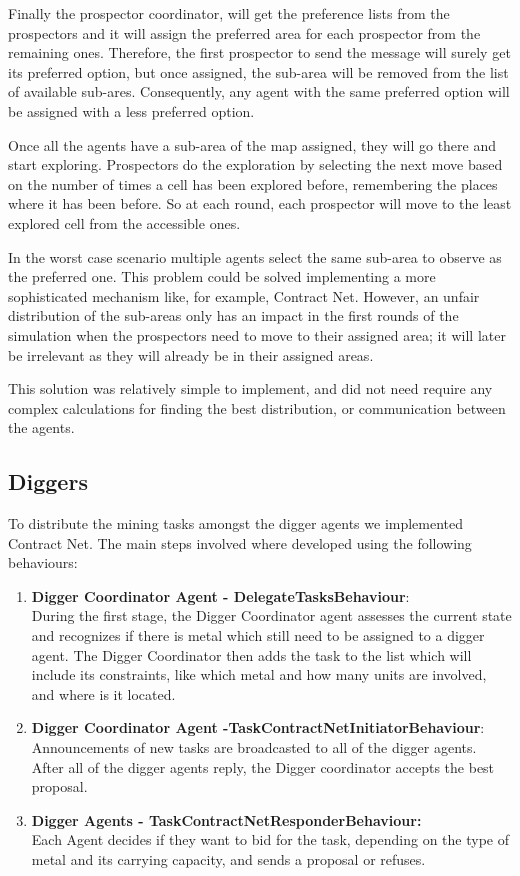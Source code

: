 Finally the prospector coordinator, will get the preference lists from the prospectors and it will assign the preferred area for each prospector from the remaining ones. Therefore, the first prospector to send the message will surely get its preferred option, but once assigned, the sub-area will be removed from the list of available sub-ares. Consequently, any agent with the same preferred option will be assigned with a less preferred option.

Once all the agents have a sub-area of the map assigned, they will go there and start exploring. Prospectors do the exploration by selecting the next move based on the number of times a cell has been explored before, remembering the places where it has been before. So at each round, each prospector will move to the least explored cell from the accessible ones. 

In the worst case scenario multiple agents select the same sub-area to observe as the preferred one. This problem could be solved implementing a more sophisticated mechanism like, for example, Contract Net. However, an unfair distribution of the sub-areas only has an impact in the first rounds of the simulation when the prospectors need to move to their assigned area; it will later be irrelevant as they will already be in their assigned areas. 

This solution was relatively simple to implement, and did not need require any complex calculations for finding the best distribution, or communication between the agents.


\subsection{Diggers}

To distribute the mining tasks amongst the digger agents we implemented Contract Net. The main steps involved where developed using the following behaviours:

\begin{enumerate}
	\item \textbf{Digger Coordinator Agent - DelegateTasksBehaviour}:\\
	During the first stage, the Digger Coordinator agent assesses the current state and recognizes if there is metal which still need to be assigned to a digger agent. The Digger Coordinator then adds the task to the list which will include its constraints, like which metal and how many units are involved, and where is it located.
	\item \textbf{Digger Coordinator Agent -TaskContractNetInitiatorBehaviour}:\\
	Announcements of new tasks are broadcasted to all of the digger agents. After all of the digger agents reply, the Digger coordinator accepts the best proposal. 
	\item \textbf{Digger Agents - TaskContractNetResponderBehaviour:}\\
	Each Agent decides if they want to bid for the task, depending on the type of metal and its carrying capacity, and sends a proposal or refuses.
\end{enumerate}

